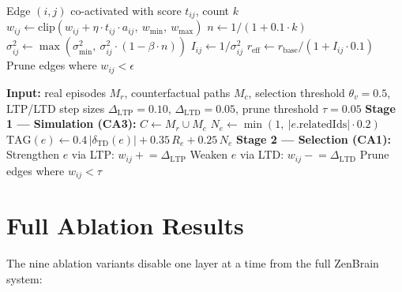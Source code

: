 \documentclass{article}
\begin{document}
\begin{algorithm}[H]
\caption{Two-Factor Synaptic Edge Update}
\begin{algorithmic}[1]
\REQUIRE Edge $(i,j)$ co-activated with score $t_{ij}$, count $k$
\STATE $w_{ij} \leftarrow \text{clip}(w_{ij} + \eta \cdot t_{ij} \cdot a_{ij},\ w_{\min},\ w_{\max})$ 
\STATE $n \leftarrow 1 / (1 + 0.1 \cdot k)$ 
\STATE $\sigma^2_{ij} \leftarrow \max(\sigma^2_{\min},\ \sigma^2_{ij} \cdot (1 - \beta \cdot n))$ 
\STATE $I_{ij} \leftarrow 1/\sigma^2_{ij}$ 
\STATE $r_{\text{eff}} \leftarrow r_{\text{base}} / (1 + I_{ij} \cdot 0.1)$ 
\STATE Prune edges where $w_{ij} < \epsilon$
\end{algorithmic}
\end{algorithm}

\begin{algorithm}[H]
\caption{Simulation-Selection Sleep Loop (CA3/CA1 RL)}
\label{alg:sleep}
\begin{algorithmic}[1]
\STATE \textbf{Input:} real episodes $M_r$, counterfactual paths $M_c$,
       selection threshold $\theta_v{=}0.5$, LTP/LTD step sizes
       $\Delta_{\mathrm{LTP}}{=}0.10$, $\Delta_{\mathrm{LTD}}{=}0.05$,
       prune threshold $\tau{=}0.05$
\STATE \textbf{Stage 1 --- Simulation (CA3):} $C \leftarrow M_r \cup M_c$ 
    \STATE $N_e \leftarrow \min(1,\ |e.\text{relatedIds}| \cdot 0.2)$ 
    \STATE $\mathrm{TAG}(e) \leftarrow 0.4\,|\delta_{\mathrm{TD}}(e)| + 0.35\,R_e + 0.25\,N_e$
\ENDFOR
\STATE \textbf{Stage 2 --- Selection (CA1):}
        \STATE Strengthen $e$ via LTP: $w_{ij} \mathrel{+}= \Delta_{\mathrm{LTP}}$
        \STATE Weaken $e$ via LTD: $w_{ij} \mathrel{-}= \Delta_{\mathrm{LTD}}$
    \ENDIF
\ENDFOR
\STATE \quad Prune edges where $w_{ij} < \tau$
\end{algorithmic}
\end{algorithm}

\section{Full Ablation Results}
\label{app:ablation}

The nine ablation variants disable one layer at a time from the full
ZenBrain system:
\end{document}
